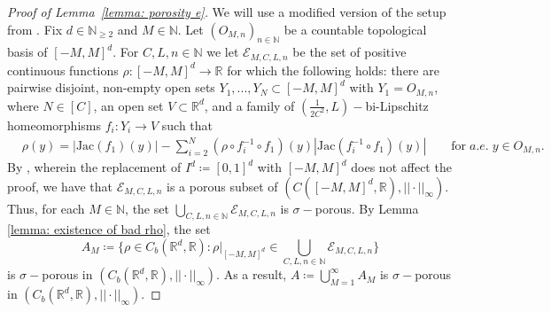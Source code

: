 \documentclass{article}
\newcommand{\R}{\mathbb{R}}
\newcommand{\N}{\mathbb{N}}
\begin{document}
\begin{proof}[Proof of Lemma~\ref{lemma: porosity e}]
     We will use a modified version of the setup from \cite[Porous decomposition of $\mathcal{E}$]{dymond2018mapping}. Fix $d \in \N_{\geq 2}$ and $M \in \N$.  Let $(O_{M,n})_{n \in \N}$ be a countable topological basis of $[-M,M]^d.$ 
For $C,L,n \in \N$ we let $\mathcal{E}_{M,C,L,n}$ be the set of positive
continuous functions $\rho:[-M,M]^d \to \R$ for which the following holds: there are pairwise disjoint, non-empty open sets $Y_1,...,Y_N \subset [-M,M]^d$ with $Y_1 = O_{M,n}$, where $N \in [C]$, an open set $V \subset \R^d$, and a family of $(\frac{1}{2C^2}, L)-$bi-Lipschitz homeomorphisms $f_i
: Y_i \to V$ such that
\begin{equation} \label{eq: ecln jacobian criterion}
\begin{split}
    &\rho(y) = |\text{Jac}(f_1)(y)| - \sum_{i=2}^N (\rho\circ f_i^{-1}\circ f_1)(y)|\text{Jac}(f_i^{-1} \circ f_1)(y)| \qquad \text{for}\; a.e. \; y \in O_{M,n}.
    \end{split}
\end{equation}
By \cite[Lemma $4.7$]{dymond2018mapping}, wherein the replacement of $I^d \coloneqq [0,1]^d$ with $[-M,M]^d$ does not affect the proof, we have that 
$\mathcal{E}_{M,C,L,n}$ is a porous subset of ${(C([-M,M]^d, \R),||\cdot||_{\infty}).}$ Thus, for each $M \in \N$, the set $\bigcup_{C,L,n \in \N}\mathcal{E}_{M,C,L,n}$ is $\sigma-$porous. By Lemma \ref{lemma: existence of bad rho}, the set $$A_M \coloneqq \bigg\{\rho\in C_b(\R^d,\R):\rho|_{[-M,M]^d}\in  \bigcup_{C,L,n \in \N}\mathcal{E}_{M,C,L,n}\bigg\}$$ is $\sigma-$porous in $(C_b(\R^d,\R),||\cdot||_{\infty}).$ As a result, $A \coloneqq \bigcup_{M=1}^\infty A_M$ is $\sigma-$porous in $(C_b(\R^d,\R),||\cdot||_{\infty})$.


\end{proof}
\end{document}
